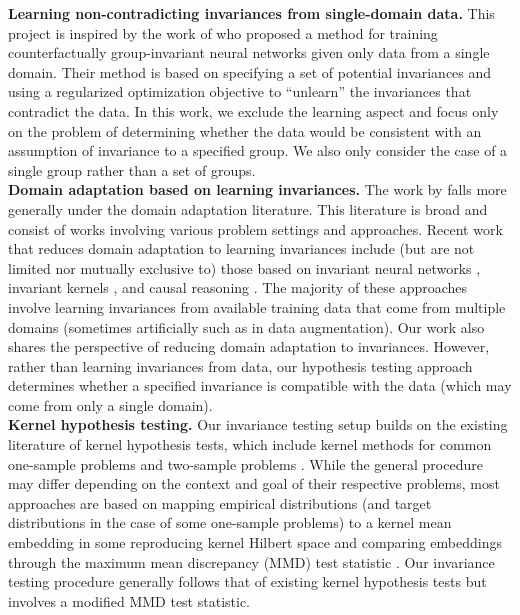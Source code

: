 \textbf{Learning non-contradicting invariances from single-domain data.} This project is inspired by the work of \textcite{Mouli:2021} who proposed a method for training counterfactually group-invariant neural networks given only data from a single domain. Their method is based on specifying a set of potential invariances and using a regularized optimization objective to ``unlearn'' the invariances that contradict the data. In this work, we exclude the learning aspect and focus only on the problem of determining whether the data would be consistent with an assumption of invariance to a specified group. We also only consider the case of a single group rather than a set of groups.
\\

\textbf{Domain adaptation based on learning invariances.} The work by \textcite{Mouli:2021} falls more generally under the domain adaptation literature. This literature is broad and consist of works involving various problem settings and approaches. Recent work that reduces domain adaptation to learning invariances include (but are not limited nor mutually exclusive to) those based on invariant neural networks \parencite{Li:2018,Gu:2019,Zhao:2019,Schwobel:2021}, invariant kernels \parencite{Li:2018:kernel,Ma:2019,Elesedy:2021:equivariant,Elesedy:2021}, and causal reasoning \parencite{Magliacane:2017,Chen:2020:scm}. The majority of these approaches involve learning invariances from available training data that come from multiple domains (sometimes artificially such as in data augmentation). Our work also shares the perspective of reducing domain adaptation to invariances. However, rather than learning invariances from data, our hypothesis testing approach determines whether a specified invariance is compatible with the data (which may come from only a single domain).
\\

\textbf{Kernel hypothesis testing.} Our invariance testing setup builds on the existing literature of kernel hypothesis tests, which include kernel methods for common one-sample problems \parencite{Zhang:2011,Doran:2014,Kellner:2015,Chwialkowski:2016,Jitkrittum:2020} and two-sample problems \parencite{Gretton:2007,Gretton:2012}. While the general procedure may differ depending on the context and goal of their respective problems, most approaches are based on mapping empirical  distributions (and target distributions in the case of some one-sample problems) to a kernel mean embedding in some reproducing kernel Hilbert space and comparing embeddings through the maximum mean discrepancy (MMD) test statistic \parencite{Harchaoui:2013}.
Our invariance testing procedure generally follows that of existing kernel hypothesis tests but involves a modified MMD test statistic.
\\

